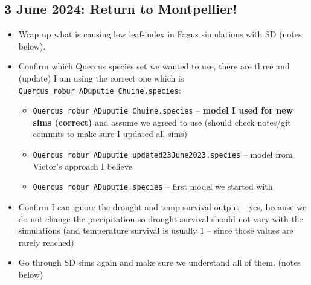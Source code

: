 \documentclass[11pt,letter]{article}
\begin{document}
\subsection{3 June 2024: Return to Montpellier!}

\begin{itemize}
\item Wrap up what is causing low leaf-index in Fagus simulations with SD (notes below).
\item Confirm which Quercus species set we wanted to use, there are three and (update) I am using the correct one which is \verb|Quercus_robur_ADuputie_Chuine.species|:
\begin{itemize}
\item \verb|Quercus_robur_ADuputie_Chuine.species| -- {\bf model I used for new sims (correct)} and assume we agreed to use (should check notes/git commits to make sure I updated all sims)
\item \verb|Quercus_robur_ADuputie_updated23June2023.species| -- model from Victor's approach I believe
\item \verb|Quercus_robur_ADuputie.species| -- first model we started with
\end{itemize}
\item Confirm I can ignore the drought and temp survival output -- yes, because we do not change the precipitation so drought survival should not vary with the simulations (and temperature survival is usually 1 -- since those values are rarely reached)
\item Go through SD sims again and make sure we understand all of them. (notes below)
\end{itemize}
\end{document}
